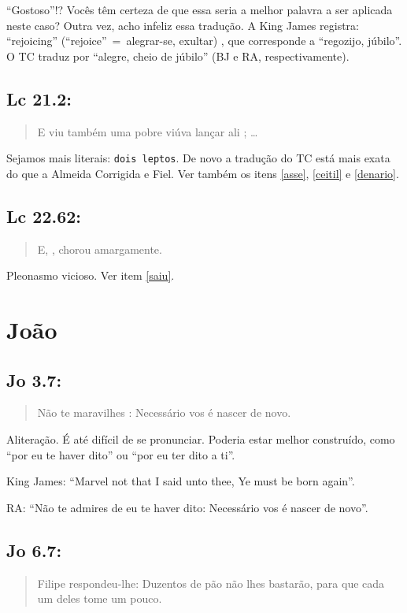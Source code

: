 ``Gostoso''!? Vocês têm certeza de que essa seria a melhor palavra a
ser aplicada neste caso? Outra vez, acho infeliz essa tradução. A King
James registra: ``rejoicing'' (``rejoice''~=~alegrar-se, exultar) ,
que corresponde a ``regozijo, júbilo''. O TC traduz por ``alegre,
cheio de júbilo'' (BJ e RA, respectivamente).

\subsection*{Lc 21.2:}
\begin{quote}
    \small
E viu também uma pobre viúva lançar ali ; \ldots
\end{quote}

Sejamos mais literais: \texttt{dois leptos}. De novo a tradução do TC está mais exata do que a Almeida Corrigida e Fiel. Ver também os itens \ref{asse}, \ref{ceitil} e \ref{denario}.


\subsection*{Lc 22.62:}
\begin{quote}
    \small
E, , chorou amargamente.
\end{quote}

Pleonasmo vicioso. Ver item \ref{saiu}.

\section{João}
\subsection*{Jo 3.7:}
\begin{quote}
    \small
Não te maravilhes : Necessário vos é nascer de novo.
\end{quote}

Aliteração. É até difícil de se pronunciar. Poderia estar melhor
construído, como ``por eu te haver dito'' ou ``por eu ter dito a ti''.

King James: ``Marvel not that I said unto thee, Ye must be born again''.

RA: ``Não te admires de eu te haver dito: Necessário vos é nascer de novo''.

\subsection*{Jo 6.7:}
\begin{quote}
    \small
Filipe respondeu-lhe: Duzentos  de pão não
lhes bastarão, para que cada um deles tome um pouco.
\end{quote}

